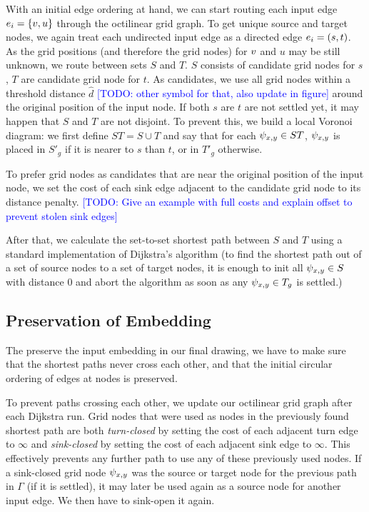 \documentclass{sig-alternate-sigmod09}
\newcommand\TODO[1]{\textcolor{blue}{\small [TODO: #1]}}
\begin{document}
With an initial edge ordering at hand, we can start routing each input edge $e_i = \{v, u\}$ through the octilinear grid graph.
To get unique source and target nodes, we again treat each undirected input edge as a directed edge $e_i = (s, t)$.
As the grid positions (and therefore the grid nodes) for $v$ and $u$ may be still unknown, we route between sets $S$ and $T$.
$S$ consists of candidate grid nodes for $s$, $T$ are candidate grid node for $t$.
As candidates, we use all grid nodes within a threshold distance $\hat d$ \TODO{other symbol for that, also update in figure} around the original position of the input node.
If both $s$ are $t$ are not settled yet, it may happen that $S$ and $T$ are not disjoint.
To prevent this, we build a local Voronoi diagram: we first define $ST = S \cup T$ and say that for each $\psi_{x, y} \in ST$, $\psi_{x, y}$ is placed in $S'_g$ if it is nearer to $s$ than $t$, or in $T'_g$ otherwise.

To prefer grid nodes as candidates that are near the original position of the input node, we set the cost of each sink edge adjacent to the candidate grid node to its distance penalty. \TODO{Give an example with full costs and explain offset to prevent stolen sink edges} 

After that, we calculate the set-to-set shortest path between $S$ and $T$ using a standard implementation of Dijkstra's algorithm (to find the shortest path out of a set of source nodes to a set of target nodes, it is enough to init all $\psi_{x, y} \in S$ with distance 0 and abort the algorithm as soon as any $\psi_{x, y} \in T_g$ is settled.)

\subsection{Preservation of Embedding}

The preserve the input embedding in our final drawing, we have to make sure that the shortest paths never cross each other, and that the initial circular ordering of edges at nodes is preserved.

To prevent paths crossing each other, we update our octilinear grid graph after each Dijkstra run.
Grid nodes that were used as nodes in the previously found shortest path are both \emph{turn-closed} by setting the cost of each adjacent turn edge to $\infty$ and \emph{sink-closed} by setting the cost of each adjacent sink edge to $\infty$.
This effectively prevents any further path to use any of these previously used nodes.
If a sink-closed grid node $\psi_{x, y}$ was the source or target node for the previous path in $\Gamma$ (if it is settled), it may later be used again as a source node for another input edge.
We then have to sink-open it again.
\end{document}
